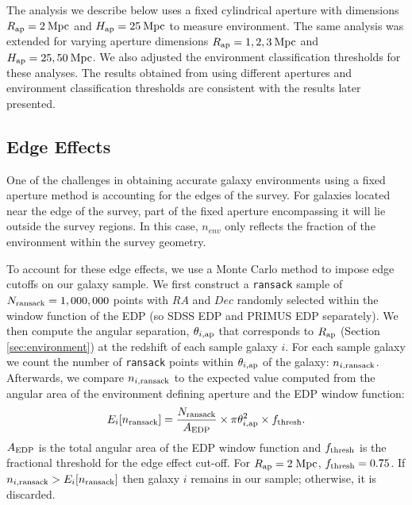 \documentclass{emulateapj}
\begin{document}
The analysis we describe below uses a fixed cylindrical aperture with dimensions $R_{\rm{ap}} = 2 \: \rm{Mpc}$ and $H_{\rm{ap}} = 25 \: \rm{Mpc}$ to measure environment. The same analysis was extended for varying aperture dimensions $R_{\rm{ap}} = 1, 2, 3 \: \rm{Mpc}$ and $H_{\rm{ap}} = 25, 50 \: \rm{Mpc}$. We also adjusted the environment classification thresholds for these analyses. The results obtained from using different apertures and environment classification thresholds are consistent with the results later presented.  

\subsection{Edge Effects} \label{sec:edgeeffect}
One of the challenges in obtaining accurate galaxy environments using a fixed aperture method is accounting for the edges of the survey. For galaxies located near the edge of the survey, part of the fixed aperture encompassing it will lie outside the survey regions. In this case, $n_{env}$ only reflects the fraction of the environment within the survey geometry.

To account for these edge effects, we use a Monte Carlo method to impose edge cutoffs on our galaxy sample. We first construct a \texttt{ransack} sample of  $N_{\rm{ransack}} = 1,000,000$ points with $RA$ and $Dec$ randomly selected within the window function of the EDP (so SDSS EDP and PRIMUS EDP separately). We then compute the angular separation, $\theta_{i, \rm{ap}}$ that corresponds to $R_{\rm{ap}}$ (Section \ref{sec:environment}) at the redshift of each sample galaxy $i$. For each sample galaxy we count the number of \texttt{ransack} points within $\theta_{i, \rm{ap}}$ of the galaxy: $n_{i,\rm{ransack}}$. Afterwards, we compare $n_{i,\rm{ransack}}$ to the expected value computed from the angular area of the environment defining aperture and the EDP window function: 
\begin{equation} \label{eq:ransack}
E_{i}[n_{\rm{ransack}}] = \frac{N_{\rm{ransack}}}{A_{\rm{EDP}}}\times {\pi \theta_{i, \rm{ap}}^2} \times f_{\rm{thresh}}. 
\end{equation} 
$A_{\rm{EDP}}$ is the total angular area of the EDP window function and $f_{\rm{thresh}}$ is the fractional threshold for the edge effect cut-off. For $R_{\rm{ap}}= 2\;\rm{Mpc}$, $f_{\rm{thresh}} = 0.75$. If $n_{i, \rm{ransack}} > E_{i}[n_{\rm{ransack}}]$ then galaxy $i$ remains in our sample; otherwise, it is discarded. 
\end{document}
